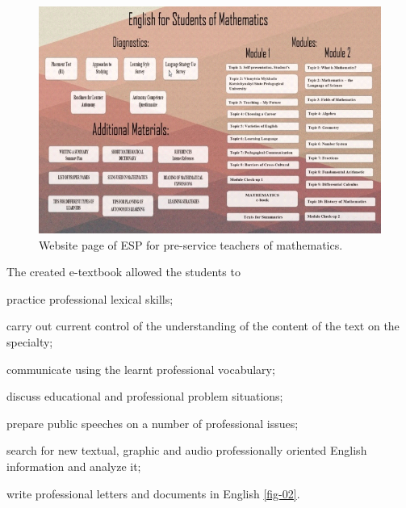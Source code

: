 \begin{figure}[htpb]
\centering
\begin{minipage}{.65\textwidth}
\caption{Website page of ESP for pre-service teachers of mathematics.}	
\label{fig-01}
\includegraphics[width=\textwidth]{figure01}
\end{minipage}
\end{figure}
The created e-textbook allowed the students to \begin{enumerate*}[label=\arabic*)]
	
	\item practice professional
	lexical skills; 
	\item carry out current control of the understanding of the
	content of the text on the specialty; 
	\item communicate using the learnt
	professional vocabulary; 
	\item discuss educational and professional problem
	situations; 
	\item prepare public speeches on a number of professional
	issues; 
	\item search for new textual, graphic and audio professionally
	oriented English information and analyze it; 
	\item write professional
	letters and documents in English \cref{fig-02}.
\end{enumerate*}

